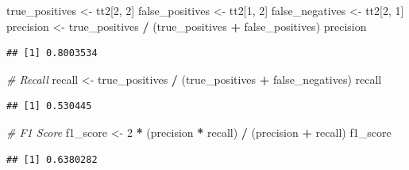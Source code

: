 \documentclass[
  twoside]{article}
\newenvironment{Shaded}{\begin{snugshade}}{\end{snugshade}}
\newcommand{\CommentTok}[1]{\textcolor[rgb]{0.56,0.35,0.01}{\textit{#1}}}
\newcommand{\DecValTok}[1]{\textcolor[rgb]{0.00,0.00,0.81}{#1}}
\newcommand{\NormalTok}[1]{#1}
\newcommand{\OtherTok}[1]{\textcolor[rgb]{0.56,0.35,0.01}{#1}}
\newcommand{\SpecialCharTok}[1]{\textcolor[rgb]{0.81,0.36,0.00}{\textbf{#1}}}
\begin{document}
\begin{Shaded}
\begin{Highlighting}[]
\NormalTok{true\_positives }\OtherTok{\textless{}{-}}\NormalTok{ tt2[}\DecValTok{2}\NormalTok{, }\DecValTok{2}\NormalTok{]}
\NormalTok{false\_positives }\OtherTok{\textless{}{-}}\NormalTok{ tt2[}\DecValTok{1}\NormalTok{, }\DecValTok{2}\NormalTok{]}
\NormalTok{false\_negatives }\OtherTok{\textless{}{-}}\NormalTok{ tt2[}\DecValTok{2}\NormalTok{, }\DecValTok{1}\NormalTok{]}
\NormalTok{precision }\OtherTok{\textless{}{-}}\NormalTok{ true\_positives }\SpecialCharTok{/}\NormalTok{ (true\_positives }\SpecialCharTok{+}\NormalTok{ false\_positives)}
\NormalTok{precision}
\end{Highlighting}
\end{Shaded}

\begin{verbatim}
## [1] 0.8003534
\end{verbatim}

\begin{Shaded}
\begin{Highlighting}[]
\CommentTok{\# Recall}
\NormalTok{recall }\OtherTok{\textless{}{-}}\NormalTok{ true\_positives }\SpecialCharTok{/}\NormalTok{ (true\_positives }\SpecialCharTok{+}\NormalTok{ false\_negatives)}
\NormalTok{recall}
\end{Highlighting}
\end{Shaded}

\begin{verbatim}
## [1] 0.530445
\end{verbatim}

\begin{Shaded}
\begin{Highlighting}[]
\CommentTok{\# F1 Score}
\NormalTok{f1\_score }\OtherTok{\textless{}{-}} \DecValTok{2} \SpecialCharTok{*}\NormalTok{ (precision }\SpecialCharTok{*}\NormalTok{ recall) }\SpecialCharTok{/}\NormalTok{ (precision }\SpecialCharTok{+}\NormalTok{ recall)}
\NormalTok{f1\_score}
\end{Highlighting}
\end{Shaded}

\begin{verbatim}
## [1] 0.6380282
\end{verbatim}
\end{document}
